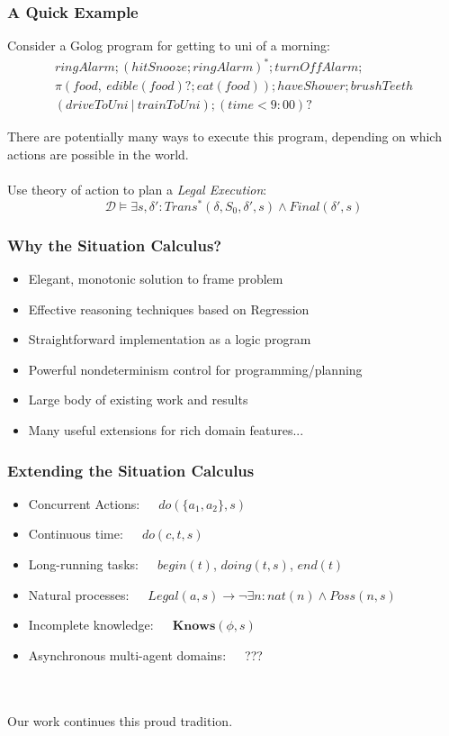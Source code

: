 \documentclass{beamer}
\newcommand{\Dt}{\mathcal{D}}
\newcommand{\Knows}{\mathbf{Knows}}
\begin{document}
\begin{frame}
\frametitle{A Quick Example}
Consider a Golog program for getting to uni of a morning:\[
\begin{array}{c}
ringAlarm;(hitSnooze; ringAlarm)^*;turnOffAlarm;\\
\pi(food,\ edible(food)?;eat(food)); haveShower; brushTeeth\\
(driveToUni\ |\ trainToUni); (time<9:00)?
\end{array}\]

There are potentially many ways to execute this program, depending on which 
actions are possible in the world.
\pause
\ \\
\ \\
Use theory of action to plan a \emph{Legal Execution}:\[
\Dt \models \exists s,\delta': Trans^{*}(\delta,S_0,\delta',s) \wedge Final(\delta',s)\]

\end{frame}

\begin{frame}
\frametitle{Why the Situation Calculus?}
\begin{itemize}
\item Elegant, monotonic solution to frame problem
\item Effective reasoning techniques based on Regression
\item Straightforward implementation as a logic program
\item Powerful nondeterminism control for programming/planning
\item Large body of existing work and results
\item Many useful extensions for rich domain features...
\end{itemize}
\end{frame}

\begin{frame}
\frametitle{Extending the Situation Calculus}
\begin{itemize}
\pause
\item Concurrent Actions:\ \ \ $do(\{a_1,a_2\},s)$
\pause
\item Continuous time:\ \ \ $do(c,t,s)$
\pause
\item Long-running tasks:\ \ \ $begin(t)$, $doing(t,s)$, $end(t)$
\pause
\item Natural processes:\ \ \ $Legal(a,s)\rightarrow\neg\exists n: nat(n) \wedge Poss(n,s)$
\pause
\item Incomplete knowledge:\ \ \ $\Knows(\phi,s)$
\pause
\item Asynchronous multi-agent domains:\ \ \ ???
\end{itemize}
\ \\
\ \\
\pause
Our work continues this proud tradition.
\end{frame}
\end{document}
